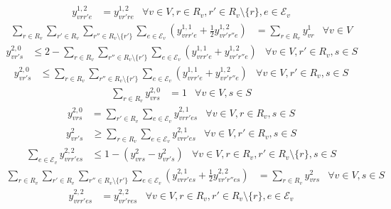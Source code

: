 \documentclass[11pt,english]{article}
\begin{document}
\begin{align}
   y_{vrr'e}^{1,2} &= y_{vr're}^{1,2} & \forall v \in V, r \in R_v, r' \in R_v\setminus \{r\}, e \in \mathcal{E}_v \label{eq:route_select_6}
\end{align}
\begin{align}
    \sum_{r \in R_v} \sum_{r' \in R_v} \sum_{r'' \in R_v\setminus \{r'\}} \sum_{e \in \mathcal{E}_v} (y_{vrr'e}^{1,1} + \frac{1}{2} y_{vr'r''e}^{1,2}) &= \sum_{r \in R_v} y_{vr}^1 & \forall v \in V \label{eq:route_select_7}
\end{align}
\begin{align}
    y_{vr's}^{2,0} &\leq 2 - \sum_{r \in R_v} \sum_{r'' \in R_v \setminus \{r'\}} \sum_{e \in \mathcal{E}_v} (y_{vrr'e}^{1,1} + y_{vr'r''e}^{1,2}) & \forall v \in V, r' \in R_v, s \in S \label{eq:route_select_8}
\end{align}
\begin{align}
    y_{vr's}^{2,0} &\leq \sum_{r \in R_v} \sum_{r'' \in R_v \setminus \{r'\}} \sum_{e \in \mathcal{E}_v} (y_{vrr'e}^{1,1} + y_{vr'r''e}^{1,2}) & \forall v \in V, r' \in R_v, s \in S \label{eq:route_select_9}
\end{align}
\begin{align}
    \sum_{r \in R_v} y_{vrs}^{2,0} &= 1 & \forall v \in V, s \in S \label{eq:route_select_10}
\end{align}
\begin{align}
    y_{vrs}^{2,0} &= \sum_{r' \in R_v} \sum_{e \in \mathcal{E}_v} y_{vrr'es}^{2,1}  & \forall v \in V, r \in R_v, s \in S \label{eq:route_select_11}
\end{align}
\begin{align}
   y_{vr's}^2 &\geq \sum_{r \in R_v} \sum_{e \in \mathcal{E}_v}  y_{vrr'es}^{2,1} & \forall v \in V, r' \in R_v, s \in S \label{eq:route_select_12}
\end{align}
\begin{align}
    \sum_{e \in \mathcal{E}_v} y_{vrr'es}^{2,2} &\leq 1 - (y_{vrs}^2 - y_{vr's}^2) & \forall v \in V, r \in R_v, r' \in R_v\setminus \{r\}, s \in S \label{eq:route_select_13}
\end{align}
\begin{align}
    \sum_{r \in R_v} \sum_{r' \in R_v} \sum_{r'' \in R_v\setminus \{r'\}} \sum_{e \in \mathcal{E}_v} (y_{vrr'es}^{2,1} + \frac{1}{2} y_{vr'r''es}^{2,2}) &= \sum_{r \in R_v} y_{vrs}^2 & \forall v \in V, s \in S \label{eq:route_select_14}
\end{align}
\begin{align}
   y_{vrr'es}^{2,2} &= y_{vr'res}^{2,2} & \forall v \in V, r \in R_v, r' \in R_v\setminus \{r\}, e \in \mathcal{E}_v \label{eq:route_select_15}
\end{align}
\end{document}
